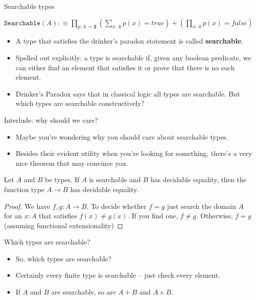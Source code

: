 \documentclass{beamer}
\begin{document}
\begin{frame}{Searchable types}
\begin{center}
	$\displaystyle \texttt{Searchable}(A) :\equiv \prod_{p : A \to \mathbf{2}} \left(\sum_{x : A} p(x) = true\right) + \left(\prod_{x : A} p(x) = false\right)$
\end{center}
\begin{itemize}
	\item A type that satisfies the drinker's paradox statement is called \textbf{searchable}.
	\item Spelled out explicitly: a type is searchable if, given any boolean predicate, we can either find an element that satisfies it or prove that there is no such element.
	\item Drinker's Paradox says that in classical logic all types are searchable. But which types are searchable constructively?
\end{itemize}
\end{frame}

\begin{frame}{Interlude: why should we care?}
\begin{itemize}
	\item Maybe you're wondering why you should care about searchable types.
	\item Besides their evident utility when you're looking for something, there's a very nice theorem that may convince you.
\end{itemize}
\begin{theorem}
	Let $A$ and $B$ be types. If $A$ is searchable and $B$ has decidable equality, then the function type $A \to B$ has decidable equality.
\end{theorem}
\begin{proof}
	We have $f, g : A \to B$. To decide whether $f = g$ just search the domain $A$ for an $x : A$ that satisfies $f(x) \neq g(x)$. If you find one, $f \neq g$. Otherwise, $f = g$ (assuming functional extensionality)
\end{proof}
\end{frame}

\begin{frame}{Which types are searchable?}
\begin{itemize}
	\item So, which types are searchable?
	\item Certainly every finite type is searchable -- just check every element.
	\item If $A$ and $B$ are searchable, so are $A + B$ and $A \times B$.
\end{itemize}
\end{frame}
\end{document}
